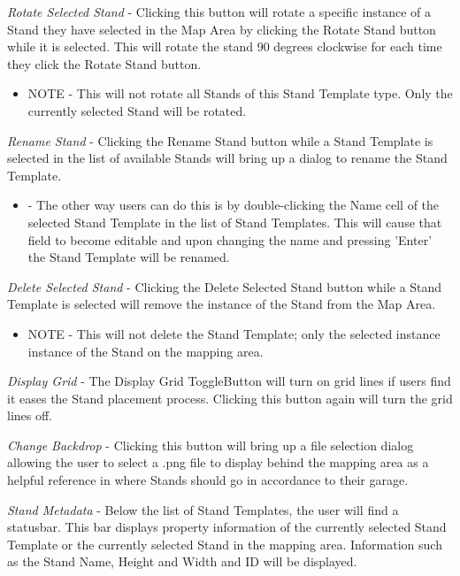 \documentclass{report}
\begin{document}
\emph{Rotate Selected Stand} - Clicking this button will rotate a specific instance of
a Stand they have selected in the Map Area by clicking the Rotate Stand button while 
it is selected. This will rotate the stand 90 degrees clockwise for each time they click 
the Rotate Stand button.

\begin{itemize}
	\item NOTE - This will not rotate all Stands of this Stand Template type. Only the
currently selected Stand will be rotated.
\end{itemize}

\emph{Rename Stand} - Clicking the Rename Stand button while a Stand Template is 
selected in the list of available Stands will bring up a dialog to rename the Stand Template.
\begin{itemize}
	\item - The other way users can do this is by double-clicking the Name cell of 
the selected Stand Template in the list of Stand Templates. This will cause that field to
become editable and upon changing the name and pressing 'Enter' the Stand Template will
be renamed.
\end{itemize} 

\emph{Delete Selected Stand} - Clicking the Delete Selected Stand button while a 
Stand Template is selected will remove the instance of the Stand from the Map Area.

\begin{itemize}
\item NOTE - This will not delete the Stand Template; only the selected instance
instance of the Stand on the mapping area.
\end{itemize}

\emph{Display Grid} - The Display Grid ToggleButton will turn on grid lines if users 
find it eases the Stand placement process. Clicking this button again will turn the grid
lines off.

\emph{Change Backdrop} - Clicking this button will bring up a file selection dialog 
allowing the user to select a .png file to display behind the mapping area as a 
helpful reference in where Stands should go in accordance to their garage.

\emph{Stand Metadata} - Below the list of Stand Templates, the user will find a
statusbar. This bar displays property information of the currently selected Stand
Template or the currently selected Stand in the mapping area. Information such as
the Stand Name, Height and Width and ID will be displayed.
\end{document}
